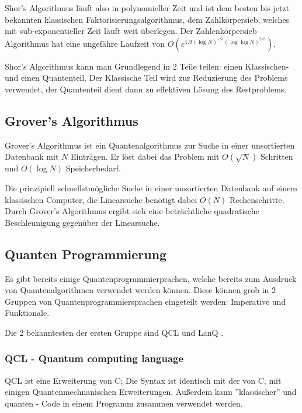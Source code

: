 Shor's Algorithmus läuft also in polynomieller Zeit und ist dem besten bis jetzt bekannten klassischen Faktorisierungsalgorithmus, dem Zahlkörpersieb, welches mit sub-exponentieller Zeit läuft weit überlegen.
Der Zahlenkörpersieb Algorithmus hat eine ungefähre Laufzeit von $O(e^{1.9 (\log{N})^{1/3} (\log{\log{N}})^{2/3}})$. \cite{numberfieldsieve}


Shor's Algorithmus kann man Grundlegend in 2 Teile teilen: einen Klassischen- und einen Quantenteil.
Der Klassische Teil wird zur Reduzierung des Problems verwendet, der Quantenteil dient dann zu effektiven Lösung des Restproblems.


\subsection{Grover's Algorithmus}
\label{sec:Grover's Algorithmus}

Grover's Algorithmus ist ein Quantenalgorithmus zur Suche in einer unsortierten Datenbank mit $N$ Einträgen. Er löst dabei das Problem mit $O(\sqrt{N})$ Schritten und $O(\log N)$ Speicherbedarf.

Die prinzipiell schnellstmögliche Suche in einer unsortierten Datenbank auf einem klassischen Computer, die Linearsuche benötigt dabei $O(N)$ Rechenschritte.
Durch Grover's Algorithmus ergibt sich eine beträchtliche quadratische Beschleunigung gegenüber der Linearsuche.


\subsection{Quanten Programmierung}
\label{sec:Quanten Programmierung}

Es gibt bereits einige Quantenprogrammierprachen, welche bereits zum Ausdruck von Quantenalgorithmen verwendet werden können.
Diese können grob in 2 Gruppen von Quantenprogrammiersprachen eingeteilt werden: Imperative und Funktionale.

Die 2 bekanntesten der ersten Gruppe sind QCL \cite{qcl} und LanQ \cite{lanq}.


\subsubsection{QCL - Quantum computing language}
\label{sec:QCL - Quantum computing language}

QCL ist eine Erweiterung von C; Die Syntax ist identisch mit der von C, mit einigen Quantenmechnanischen Erweiterungen.
Außerdem kann ''klassischer'' und quanten - Code in einem Programm zusammen verwendet werden.

